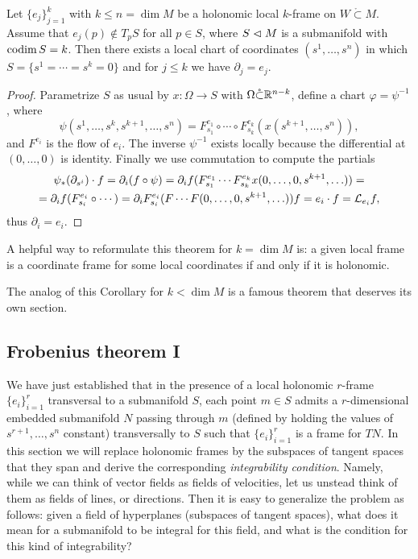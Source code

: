 \begin{thm}\label{thm rectification}
    Let $\{e_j\}_{j=1}^k$ with $k\leq n=\dim M$ be a holonomic local $k$-frame on $W\mathring{\subset}M$. Assume that $e_j(p)\notin T_p S$ for all $p\in S$, where $S\vartriangleleft M$ is a submanifold with $\operatorname{codim} S=k$. Then there exists a local chart of coordinates $(s^1,\ldots,s^n)$ in which $S=\{s^1=\cdots=s^k=0\}$ and for $j\leq k$ we have $\partial_j=e_j$.
\end{thm}
\begin{proof}
    Parametrize $S$ as usual by $x:\Omega\to S$ with $\Omega\mathring{\subset}\mathbb{R}^{n-k}$, define a chart $\varphi=\psi^{-1}$, where
    \[\psi(s^1,\ldots,s^k,s^{k+1},\ldots,s^n)=F^{e_1}_{s_1}\circ\cdots\circ F^{e_k}_{s_k}(x(s^{k+1},\ldots,s^n)),\]
    and $F^{e_i}$ is the flow of $e_i$. The inverse $\psi^{-1}$ exists locally because the differential at $(0,\ldots,0)$ is identity. Finally we use commutation to compute the partials
    \begin{multline}
        \psi_\ast (\partial_{s^i})\cdot f=\partial_i(f\circ\psi)=\partial_i f(F^{e_1}_{s_1}\cdots F^{e_k}_{s_k} x(0,\ldots,0,s^{k+1},\ldots))=\\=\partial_i f(F^{e_i}_{s_i}\circ\cdots )=\partial_i F^{e_i}_{s_i}(F\cdots F(0,\ldots,0,s^{k+1},\ldots))f=e_i\cdot f=\mathcal{L}_{e_i}f,
    \end{multline}
    thus $\partial_i=e_i$.
\end{proof}

\begin{cor}
    A helpful way to reformulate this theorem for $k=\dim M$ is: a given local frame is a coordinate frame for some local coordinates if and only if it is holonomic.
\end{cor}

The analog of this Corollary for $k<\dim M$ is a famous theorem that deserves its own section.





\subsection{Frobenius theorem I}\label{sec: frobenius i}

We have just established that in the presence of a local holonomic $r$-frame $\{e_i\}_{i=1}^r$ transversal to a submanifold $S$, each point $m\in S$ admits a $r$-dimensional embedded submanifold $N$ passing through $m$ (defined by holding the values of $s^{r+1},\ldots,s^n$ constant) transversally to $S$ such that $\{e_i\}_{i=1}^r$ is a frame for $TN$. In this section we will replace holonomic frames by the subspaces of tangent spaces that they span and derive the corresponding \emph{integrability condition}. Namely, while we can think of vector fields as fields of velocities, let us unstead think of them as fields of lines, or directions. Then it is easy to generalize the problem as follows: given a field of hyperplanes (subspaces of tangent spaces), what does it mean for a submanifold to be integral for this field, and what is the condition for this kind of integrability?

